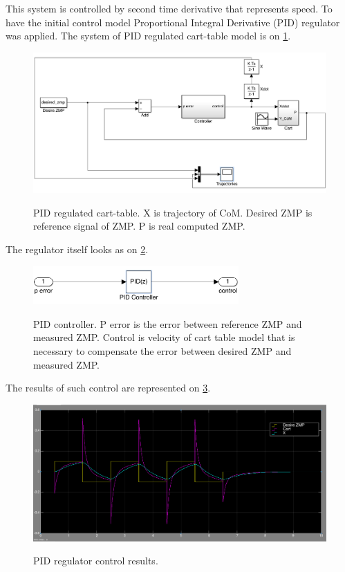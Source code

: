 \documentclass[12pt,a4paper]{report}
\begin{document}
		This system is controlled by second time derivative that represents speed. To have the initial control model Proportional Integral Derivative (PID) regulator was applied. The system of PID regulated cart-table model is on \cref{fig:15}.
		
		\begin{figure}[h!]
			\vspace{-0.2cm}
			\centering
			{\includegraphics[width=1\textwidth]{15}}
			\caption{PID regulated cart-table. X is trajectory of CoM. Desired ZMP is reference signal of ZMP. P is real computed ZMP.}
			\label{fig:15}
			\vspace{-0.1cm}
		\end{figure}
		
		The regulator itself looks as on \cref{fig:16}.
		
		\begin{figure}[h!]
			\vspace{-0.2cm}
			\centering
			{\includegraphics[width=0.7\textwidth]{16}}
			\caption{PID controller. P error is the error between reference ZMP and measured ZMP. Control is velocity of cart table model that is necessary to compensate the error between desired ZMP and measured ZMP.}
			\label{fig:16}
			\vspace{-0.1cm}
		\end{figure}
		
		The results of such control are represented on \cref{fig:17}.
		
		\begin{figure}[h!]
			\vspace{-0.2cm}
			\centering
			{\includegraphics[width=1\textwidth]{17}}
			\caption{PID regulator control results.}
			\label{fig:17}
			\vspace{-0.1cm}
		\end{figure}
		
\end{document}
